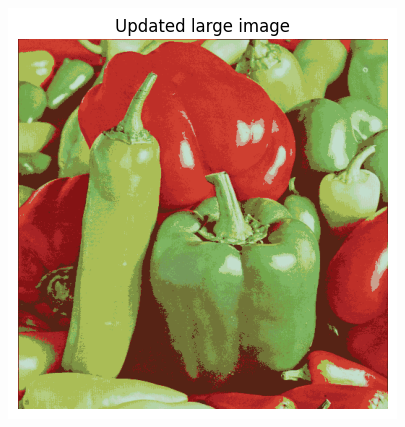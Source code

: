 \begin{answer}
\begin{figure}[!h]
\endminipage\hfill
{}%
  \includegraphics[width=\linewidth]{k_means/updated_large.png}
\endminipage
\end{figure}
\\ \\  \\ \\ \\ \\ \\ \\ \\ \\ \\ \\ \\ \\ \\ \\ 
\end{answer}
